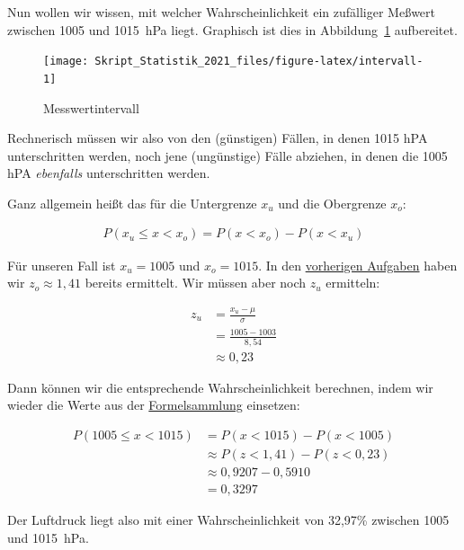 \documentclass[
  11pt,
  ngerman,
  a4paper,
]{report}
\begin{document}
Nun wollen wir wissen, mit welcher Wahrscheinlichkeit ein zufälliger Meßwert zwischen 1005 und 1015~hPa liegt. Graphisch ist dies in Abbildung~\ref{fig:intervall} aufbereitet.

\begin{figure}[!h]

{\centering \texttt{[image: Skript\_Statistik\_2021\_files/figure-latex/intervall-1]} 

}

\caption{Messwertintervall}\label{fig:intervall}
\end{figure}

Rechnerisch müssen wir also von den (günstigen) Fällen, in denen 1015 hPA unterschritten werden, noch jene (ungünstige) Fälle abziehen, in denen die 1005 hPA \emph{ebenfalls} unterschritten werden.

Ganz allgemein heißt das für die Untergrenze \(x_u\) und die Obergrenze \(x_o\):

\[\begin{aligned}
    P(x_{u} \leq x < x_{o}) = P(x < x_{o}) - P(x < x_{u})
  \end{aligned}
  \label{eq:intervall}
\]

Für unseren Fall ist \(x_u=1005\) und \(x_o=1015\). In den \protect\hyperlink{unter}{vorherigen Aufgaben} haben wir \(z_o\approx1,41\) bereits ermittelt. Wir müssen aber noch \(z_u\) ermitteln:

\[\begin{aligned}
    z_u &= \frac{x_u-\mu}{\sigma} \\[4pt]
        &= \frac{1005-1003}{8{,}54}  \\[4pt]
        &\approx 0{,}23
\end{aligned}\]

Dann können wir die entsprechende Wahrscheinlichkeit berechnen, indem wir wieder die Werte aus der \href{Formelsammlung\%20und\%20Wertetabellen.pdf}{Formelsammlung} einsetzen:

\[
  \begin{aligned}
    P(1005 \leq x < 1015) &= P(x < 1015) - P(x < 1005) \\
    &\approx P(z < 1{,}41) - P(z < 0{,}23) \\
    &\approx 0{,}9207- 0{,}5910  \\
    &= 0{,}3297
  \end{aligned}
\]

Der Luftdruck liegt also mit einer Wahrscheinlichkeit von 32,97\% zwischen 1005 und 1015~hPa.
\end{document}
